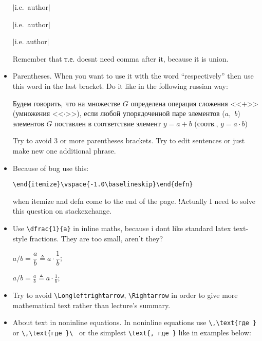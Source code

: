 \documentclass[a5paper,openany,9pt]{extbook}
\begin{document}
\begin{itemize}
$\Bigr|$i.e.~author$\Bigr|$

$\Bigr|$i.e.\ author$\Bigr|$

$\Bigr|$i.e. author$\Bigr|$

Remember that т.е. doesnt need comma after it, because it is union.


\item
Parentheses. When you want to use it with the word ``respectively'' then use this word in the last bracket. Do it like in the following russian way:

Будем говорить, что на множестве $G$ определена операция сложения <<$+$>> (умножения <<$\cdot$>>), если любой упорядоченной паре элементов ($a$,~$b$) элементов $G$ поставлен в соответствие элемент $y = a + b$ (соотв., $y = a\cdot b$)

Try to avoid 3 or more parentheses brackets. Try to edit sentences or just make new one additional phrase.

\item 

Because of bug use this: 

\verb|\end{itemize}\vspace{-1.0\baselineskip}\end{defn}|

when itemize and defn come to the end of the page. !Actually I need to solve this question on stackexchange.

\item 

Use \verb|\dfrac{1}{a}| in inline maths, because i dont like standard latex text-style fractions. They are too small, aren't they?

$a / b =  \dfrac{a}{b} \triangleq a \cdot \dfrac{1}{b}$; 

$a / b =  \frac{a}{b} \triangleq a \cdot \frac{1}{b}$; 

\item 

Try to avoid \verb|\Longleftrightarrow|, \verb|\Rightarrow| in order to give more mathematical text rather than lecture's summary.

\item 
About text in noninline equations. In noninline equations use \verb|\,\text{где }| or \verb|\,\text{где }\ | or the simplest \verb|\text{, где }| like in examples below:


\end{itemize}
\end{document}
